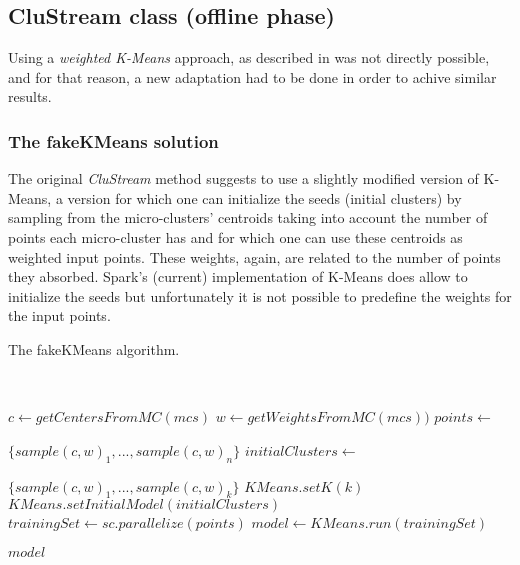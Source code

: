 \subsection{CluStream class (offline phase)}

Using a \textit{weighted K-Means} approach, as described in \cite{clustreamOrig} was not directly possible, and for that reason, a new adaptation had to be done in order to achive similar results.


\subsubsection{The fakeKMeans solution}

The original \textit{CluStream} method suggests to use a slightly modified version of K-Means, a version for which one can initialize the seeds (initial clusters) by sampling from the micro-clusters' centroids taking into account the number of points each micro-cluster has and for which one can use these centroids as weighted input points. These weights, again, are related to the number of points they absorbed. Spark's (current) implementation of K-Means does allow to initialize the seeds but unfortunately it is not possible to predefine the weights for the input points.


\begin{algorithm}[h]
 \caption{The fakeKMeans algorithm.}\label{alg:fakekmeans}
 \begin{algorithmic}[1]
 
   \
  
   
  \vspace{10pt}
  
  \State $c \gets getCentersFromMC(mcs)$
  \State $w \gets getWeightsFromMC(mcs))$
  \State $points \gets $
  \item[] $\{sample(c,w)_1,... , sample(c,w)_{n}\}$
  \State $initialClusters \gets$ 
  \item[] $ \{sample(c,w)_1,... , sample(c,w)_k\}$
  \State $KMeans.setK(k)$
  \State $KMeans.setInitialModel(initialClusters)$
  \State $trainingSet \gets sc.parallelize(points)$
  \State $model \gets KMeans.run(trainingSet)$
  
  \Return $model$
 \end{algorithmic}
\end{algorithm}

